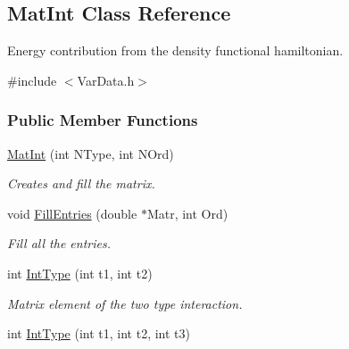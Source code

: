\hypertarget{classMatInt}{\subsection{\-Mat\-Int \-Class \-Reference}
\label{classMatInt}
}


\-Energy contribution from the density functional hamiltonian.  




{\ttfamily \#include $<$\-Var\-Data.\-h$>$}

\subsubsection*{\-Public \-Member \-Functions}
\begin{DoxyCompactItemize}
\item 
\hypertarget{classMatInt_a1d837fb7a673781e109b9151a56778ce}{\hyperlink{classMatInt_a1d837fb7a673781e109b9151a56778ce}{\-Mat\-Int} (int \-N\-Type, int \-N\-Ord)}\label{classMatInt_a1d837fb7a673781e109b9151a56778ce}

\begin{DoxyCompactList}\small\item\em \-Creates and fill the matrix. \end{DoxyCompactList}\item 
\hypertarget{classMatInt_ab41daf2c7d76c51cc5e440656108477b}{void \hyperlink{classMatInt_ab41daf2c7d76c51cc5e440656108477b}{\-Fill\-Entries} (double $\ast$\-Matr, int \-Ord)}\label{classMatInt_ab41daf2c7d76c51cc5e440656108477b}

\begin{DoxyCompactList}\small\item\em \-Fill all the entries. \end{DoxyCompactList}\item 
\hypertarget{classMatInt_af5860927a869a9e6d2e82331567537b9}{int \hyperlink{classMatInt_af5860927a869a9e6d2e82331567537b9}{\-Int\-Type} (int t1, int t2)}\label{classMatInt_af5860927a869a9e6d2e82331567537b9}

\begin{DoxyCompactList}\small\item\em \-Matrix element of the two type interaction. \end{DoxyCompactList}\item 
\hypertarget{classMatInt_a0ddfc8269f12a7eeff2ec3074d9803e8}{int \hyperlink{classMatInt_a0ddfc8269f12a7eeff2ec3074d9803e8}{\-Int\-Type} (int t1, int t2, int t3)}\label{classMatInt_a0ddfc8269f12a7eeff2ec3074d9803e8}


\end{DoxyCompactItemize}
